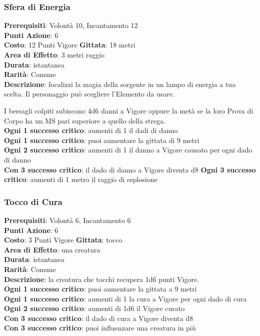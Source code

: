 \documentclass[12pt,a4paper,twoside,openany]{book}
\begin{document}
\begin{multicols}{2}
\subsubsection*{Sfera di Energia}
\textbf{Prerequisiti}: Volontà 10, Incantamento 12\\
\textbf{Punti Azione}: 6\\
\textbf{Costo}: 12 Punti Vigore
\textbf{Gittata}: 18 metri\\
\textbf{Area di Effetto}: 3 metri raggio\\
\textbf{Durata}: istantanea\\
\textbf{Rarità}: Comune\\
\textbf{Descrizione}: focalizzi la magia della sorgente in un lampo di energia a tua scelta. Il personaggio può scegliere l'Elemento da usare.

I bersagli colpiti subiscono 4d6 danni a Vigore oppure la metà se la loro Prova di Corpo ha un MS pari superiore a quello della strega.\\
\textbf{Ogni 1 successo critico}: aumenti di 1 il dadi di danno\\
\textbf{Ogni 1 successo critico}: puoi aumentare la gittata di 9 metri\\
\textbf{Ogni 2 successo critico}: aumenti di 1 il danno a Vigore causato per ogni dado di danno\\
\textbf{Con 3 successo critico}: il dado di danno a Vigore diventa d8
\textbf{Ogni 3 successo critico}: aumenti di 1 metro il raggio di esplosione

\subsubsection*{Tocco di Cura}
\textbf{Prerequisiti}: Volontà 6, Incantamento 6\\
\textbf{Punti Azione}: 6\\
\textbf{Costo}: 3 Punti Vigore
\textbf{Gittata}: tocco \\
\textbf{Area di Effetto}: una creatura\\
\textbf{Durata}: istantanea\\
\textbf{Rarità}: Comune\\
\textbf{Descrizione}: la creatura che tocchi recupera 1d6 punti Vigore.\\
\textbf{Ogni 1 successo critico}: puoi aumentare la gittata a 9 metri\\
\textbf{Ogni 1 successo critico}: aumenti di 1 la cura a Vigore per ogni dado di cura
\textbf{Ogni 2 successo critico}: aumenti di 1d6 il Vigore curato\\
\textbf{Con 3 successo critico}: il dado di cura a Vigore diventa d8\\
\textbf{Con 3 successo critico}: puoi influenzare una creatura in più\\


\end{multicols}
\end{document}
